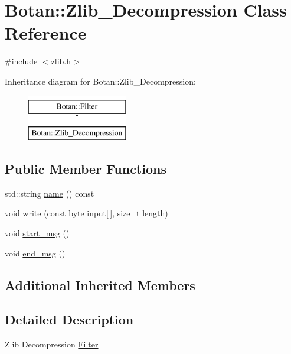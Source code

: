 \hypertarget{classBotan_1_1Zlib__Decompression}{\section{Botan\-:\-:Zlib\-\_\-\-Decompression Class Reference}
\label{classBotan_1_1Zlib__Decompression}
}


{\ttfamily \#include $<$zlib.\-h$>$}

Inheritance diagram for Botan\-:\-:Zlib\-\_\-\-Decompression\-:\begin{figure}[H]
\begin{center}
\leavevmode
\includegraphics[height=2.000000cm]{classBotan_1_1Zlib__Decompression}
\end{center}
\end{figure}
\subsection*{Public Member Functions}
\begin{DoxyCompactItemize}
\item 
std\-::string \hyperlink{classBotan_1_1Zlib__Decompression_abc398ce66acb8581565432c59c51f5ec}{name} () const 
\item 
void \hyperlink{classBotan_1_1Zlib__Decompression_a58eebd3e9ff4dafed6b7b558d2f7d4e3}{write} (const \hyperlink{namespaceBotan_a7d793989d801281df48c6b19616b8b84}{byte} input\mbox{[}$\,$\mbox{]}, size\-\_\-t length)
\item 
void \hyperlink{classBotan_1_1Zlib__Decompression_ae31a66a402390afd1fc0938d9249b448}{start\-\_\-msg} ()
\item 
void \hyperlink{classBotan_1_1Zlib__Decompression_afe5b9f8bbca9c49128e10deb1705b097}{end\-\_\-msg} ()
\end{DoxyCompactItemize}
\subsection*{Additional Inherited Members}


\subsection{Detailed Description}
Zlib Decompression \hyperlink{classBotan_1_1Filter}{Filter} 

